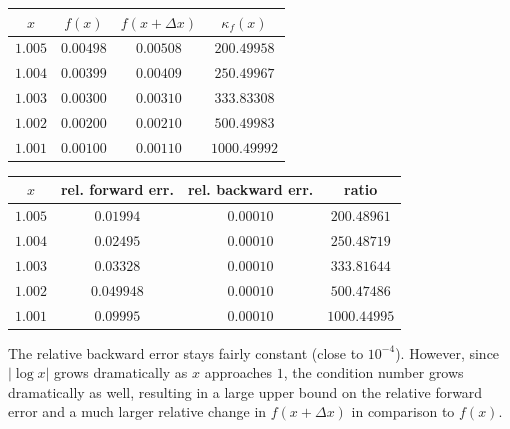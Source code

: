 \documentclass{article}
\begin{document}
\begin{center}
\begin{tabular}{|c|c|c|c|}
    \hline
    $x$ & $f(x)$ & $f(x + \Delta x)$ & $\kappa_f(x)$ \\
    \hline
    $1.005$ & $0.00498$ & $0.00508$ & $200.49958$ \\
    $1.004$ & $0.00399$ & $0.00409$ & $250.49967$ \\
    $1.003$ & $0.00300$ & $0.00310$ & $333.83308$ \\
    $1.002$ & $0.00200$ & $0.00210$ & $500.49983$ \\
    $1.001$ & $0.00100$ & $0.00110$ & $1000.49992$ \\
    \hline
\end{tabular}
\end{center}
\begin{center}
\begin{tabular}{|c|c|c|c|}
    \hline
    $x$ & rel. forward err. & rel. backward err. & ratio  \\
    \hline
    $1.005$ & $0.01994$ & $0.00010$ & $200.48961$  \\
    $1.004$ & $0.02495$ & $0.00010$ & $250.48719$ \\
    $1.003$ & $0.03328$ & $0.00010$ & $333.81644$ \\
    $1.002$ & $0.049948$ & $0.00010$ & $500.47486$\\
    $1.001$ & $0.09995$ & $0.00010$ & $1000.44995$ \\
    \hline
\end{tabular}
\end{center}
The relative backward error stays fairly constant (close to $10^{-4}$). However, since $|\log x|$ grows dramatically as $x$ approaches $1$, the condition number grows dramatically as well, resulting in a large upper bound on the relative forward error and a much larger relative change in $f(x + \Delta x)$ in comparison to $f(x)$.
\end{document}
